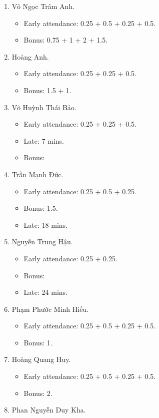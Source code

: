 \documentclass{article}
\begin{document}
\begin{enumerate}
	\item {\sc Võ Ngọc Trâm Anh.}
	\begin{itemize}
		\item Early attendance: 0.25 + 0.5 + 0.25 + 0.5.
		\item Bonus: 0.75 + 1 + 2 + 1.5.
	\end{itemize}
	\item {\sc Hoàng Anh.}
	\begin{itemize}
		\item Early attendance: 0.25 + 0.25 + 0.5.
		\item Bonus: 1.5 + 1.
	\end{itemize}
	\item {\sc Võ Huỳnh Thái Bảo.}
	\begin{itemize}
		\item Early attendance: 0.25 + 0.25 + 0.5.
		\item Late: 7 mins.
		\item Bonus: 
	\end{itemize}
	\item {\sc Trần Mạnh Đức.}
	\begin{itemize}
		\item Early attendance: 0.25 + 0.5 + 0.25.
		\item Bonus: 1.5.
		\item Late: 18 mins.
	\end{itemize}
	\item {\sc Nguyễn Trung Hậu.}
	\begin{itemize}
		\item Early attendance: 0.25 + 0.25.
		\item Bonus:
		\item Late: 24 mins.
	\end{itemize}
	\item {\sc Phạm Phước Minh Hiếu.}
	\begin{itemize}
		\item Early attendance: 0.25 + 0.5 + 0.25 + 0.5.
		\item Bonus: 1.		
	\end{itemize}
	\item {\sc Hoàng Quang Huy.}
	\begin{itemize}
		\item Early attendance: 0.25 + 0.5 + 0.25 + 0.5.
		\item Bonus: 2.
	\end{itemize}
	\item {\sc Phan Nguyễn Duy Kha.}

\end{enumerate}
\end{document}
